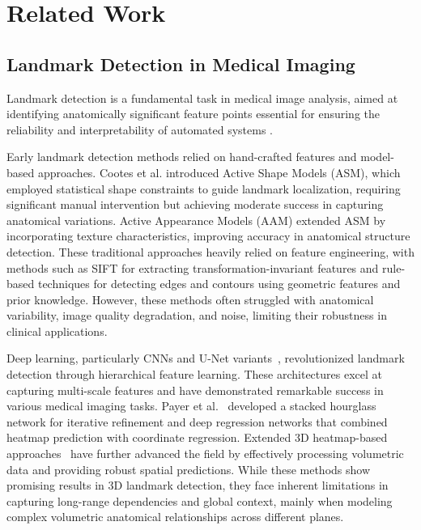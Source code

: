 \section{Related Work}\label{sec.2}
\subsection{Landmark Detection in Medical Imaging}
Landmark detection is a fundamental task in medical image analysis, aimed at identifying anatomically significant feature points essential for ensuring the reliability and interpretability of automated systems \cite{regression}. 

Early landmark detection methods relied on hand-crafted features \cite{handcrafted1, handcrafted2, handcrafted3} and model-based approaches. Cootes et al. \cite{ASM} introduced Active Shape Models (ASM), which employed statistical shape constraints to guide landmark localization, requiring significant manual intervention but achieving moderate success in capturing anatomical variations. Active Appearance Models (AAM) \cite{AAM} extended ASM by incorporating texture characteristics, improving accuracy in anatomical structure detection. These traditional approaches heavily relied on feature engineering, with methods such as SIFT \cite{SIFT} for extracting transformation-invariant features and rule-based techniques \cite{ruled1, ruled2} for detecting edges and contours using geometric features and prior knowledge. However, these methods often struggled with anatomical variability, image quality degradation, and noise, limiting their robustness in clinical applications.


Deep learning, particularly CNNs and U-Net variants~\cite{PELE, king-Unet1, king-Unet2, huang2024retigan, shao2023diffuseexpand}, revolutionized landmark detection through hierarchical feature learning. These architectures excel at capturing multi-scale features and have demonstrated remarkable success in various medical imaging tasks. Payer et al.~\cite{SCN} developed a stacked hourglass network for iterative refinement and deep regression networks that combined heatmap prediction with coordinate regression. Extended 3D heatmap-based approaches~\cite{3D-CNN1-anchor, 3D-CNN2-sr} have further advanced the field by effectively processing volumetric data and providing robust spatial predictions. While these methods show promising results in 3D landmark detection, they face inherent limitations in capturing long-range dependencies and global context, mainly when modeling complex volumetric anatomical relationships across different planes.


